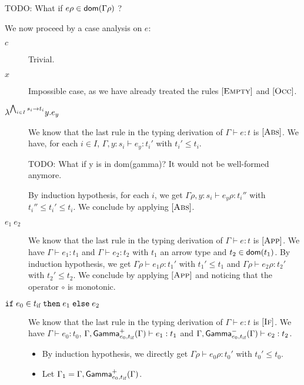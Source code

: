 \documentclass[a4paper]{article}
\theoremstyle{definition}
\begin{document}
        TODO: What if $e\rho\in\textsf{dom}(\Gamma\rho)$ ? 

        We now proceed by a case analysis on $e$:
        
        \begin{description}
          \item[$c$] Trivial.
          \item[$x$] Impossible case, as we have already treated the rules $[\textsc{Empty}]$ and $[\textsc{Occ}]$.
          \item[$\lambda^{\bigwedge_{i\in I} s_i\to t_i}y.e_y$]
          We know that the last rule in the typing derivation of $\Gamma \vdash e:t$ is $[\textsc{Abs}]$.
          We have, for each $i \in I$, $\Gamma,y:s_i \vdash e_y:t_i'$ with $t_i'\leq t_i$.
          
          TODO: What if y is in dom(gamma)? It would not be well-formed anymore.

          By induction hypothesis, for each $i$, we get  $\Gamma\rho,y:s_i \vdash e_y\rho:t_i''$ with $t_i''\leq t_i'\leq t_i$. We conclude by applying $[\textsc{Abs}]$.
          \item[$e_1\ e_2$] We know that the last rule in the typing derivation of $\Gamma \vdash e:t$ is $[\textsc{App}]$.
          We have $\Gamma\vdash e_1:t_1$ and $\Gamma\vdash e_2:t_2$ with $t_1$ an arrow type and $t_2 \in \textsf{dom}(t_1)$.
          By induction hypothesis, we get $\Gamma\rho\vdash e_1\rho:t_1'$ with $t_1' \leq t_1$ and $\Gamma\rho\vdash e_2\rho:t_2'$ with $t_2' \leq t_2$.
          We conclude by applying $[\textsc{App}]$ and noticing that the operator $\circ$ is monotonic.
          \item[$\texttt{if}\;e_0\in t_{\text{if}}\;\texttt{then}\;e_1\;\texttt{else}\;e_2$] We know that the last rule in the typing derivation of $\Gamma \vdash e:t$ is $[\textsc{If}]$.
          We have $\Gamma\vdash e_0:t_0$, $\Gamma,\textsf{Gamma}^{+}_{e_0,t_{\text{if}}}(\Gamma)\vdash e_1 : t_1$ and $\Gamma,\textsf{Gamma}^{-}_{e_0,t_{\text{if}}}(\Gamma)\vdash e_2 : t_2$.
          \begin{itemize}
            \item By induction hypothesis, we directly get $\Gamma\rho\vdash e_0\rho:t_0'$ with $t_0'\leq t_0$.
            \item Let $\Gamma_1 = \Gamma,\textsf{Gamma}^{+}_{e_0,t_{\text{if}}}(\Gamma)$.
            

\end{itemize}
\end{description}
\end{document}

